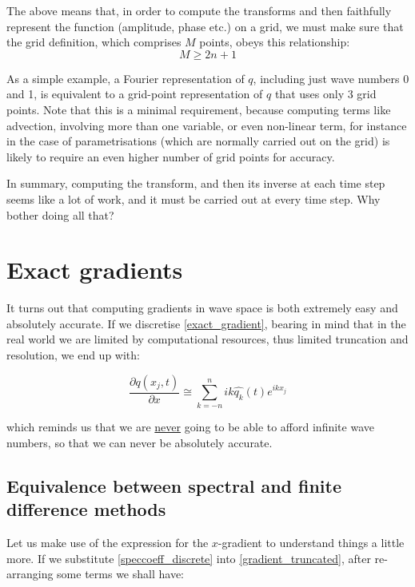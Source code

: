 \begin{definition}
The above means that, in order to compute the transforms and then faithfully represent the function (amplitude, phase etc.) on a grid, we must make sure that the grid definition, which comprises $M$ points, obeys this relationship:
\begin{equation}
	M \ge 2n+1
\end{equation}
\end{definition}
As a simple example, a Fourier representation of $q$, including just wave numbers 0 and 1, is equivalent to a grid-point representation of $q$ that uses only 3 grid points. Note that this is a minimal requirement, because computing terms like advection, involving more than one variable, or even non-linear term, for instance in the case of parametrisations (which are normally carried out on the grid) is likely to require an even higher number of grid points for accuracy.

In summary, computing the transform, and then its inverse at each time step seems like a lot of work, and it must be carried out at every time step. Why bother doing all that?

\section{Exact gradients}
It turns out that computing gradients in wave space is both extremely easy and absolutely accurate. If we discretise \ref{exact_gradient}, bearing in mind that in the real world we are limited by computational resources, thus limited truncation and resolution, we end up with:

\begin{equation}
	\frac{\partial	q(x_j,t)} {\partial x} \cong  \sum_{k=-n}^{n}  ik \widehat{q_k}(t)e^{ikx_j}
	\label{gradient_truncated}
\end{equation}

which reminds us that we are \underline{never} going to be able to afford infinite wave numbers, so that we can never be absolutely accurate.

 \subsection{Equivalence between spectral and finite difference methods}
Let us make use of the expression for the $x$-gradient to understand things a little more. If we substitute \ref{speccoeff_discrete} into \ref{gradient_truncated}, after re-arranging some terms we shall have: 

